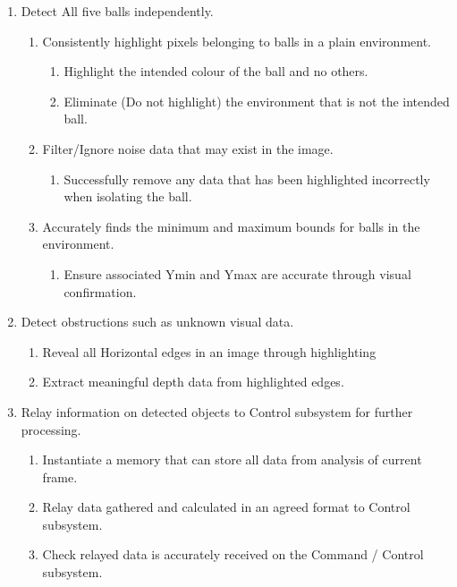 \documentclass[10pt,twoside]{article}
\begin{document}
\begin{enumerate}
\itemsep0em
  \item Detect All five balls independently. 
        \begin{enumerate}
            \itemsep-0.2em
            \item Consistently highlight pixels belonging to balls in a plain environment.
                \begin{enumerate}
                    \itemsep-0.2em
                    \item Highlight the intended colour of the ball and no others.
                    \item Eliminate (Do not highlight) the environment that is not the intended ball.
                \end{enumerate}
            \item Filter/Ignore noise data that may exist in the image.
                \begin{enumerate}
                    \itemsep-0.2em
                    \item Successfully remove any data that has been highlighted incorrectly when isolating the ball. 
                \end{enumerate}
            \item Accurately finds the minimum and maximum bounds for balls in the environment.
                \begin{enumerate}
                    \itemsep-0.2em
                    \item Ensure associated Ymin and Ymax are accurate through visual confirmation. 
                \end{enumerate}
        \end{enumerate}
  \item Detect obstructions such as unknown visual data.
        \begin{enumerate}
                    \itemsep-0.2em
                    \item Reveal all Horizontal edges in an image through highlighting
                    \item Extract meaningful depth data from highlighted edges.
        \end{enumerate}
  \item Relay information on detected objects to Control subsystem for further processing.
        \begin{enumerate}
            \itemsep-0.2em
            \item Instantiate a memory that can store all data from analysis of current frame. 
            \item Relay data gathered and calculated in an agreed format to Control subsystem.
            \item Check relayed data is accurately received on the Command / Control subsystem. 
        \end{enumerate}
\end{enumerate}
\end{document}
